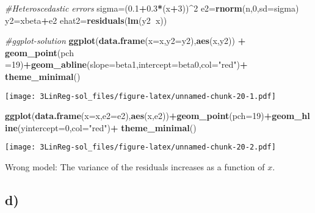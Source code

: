 \documentclass[]{article}
\newenvironment{Shaded}{\begin{snugshade}}{\end{snugshade}}
\newcommand{\KeywordTok}[1]{\textcolor[rgb]{0.13,0.29,0.53}{\textbf{#1}}}
\newcommand{\DataTypeTok}[1]{\textcolor[rgb]{0.13,0.29,0.53}{#1}}
\newcommand{\DecValTok}[1]{\textcolor[rgb]{0.00,0.00,0.81}{#1}}
\newcommand{\FloatTok}[1]{\textcolor[rgb]{0.00,0.00,0.81}{#1}}
\newcommand{\StringTok}[1]{\textcolor[rgb]{0.31,0.60,0.02}{#1}}
\newcommand{\CommentTok}[1]{\textcolor[rgb]{0.56,0.35,0.01}{\textit{#1}}}
\newcommand{\OperatorTok}[1]{\textcolor[rgb]{0.81,0.36,0.00}{\textbf{#1}}}
\newcommand{\NormalTok}[1]{#1}
\begin{document}
\begin{Shaded}
\begin{Highlighting}[]
\CommentTok{#Heteroscedastic errors}
\NormalTok{sigma=(}\FloatTok{0.1}\OperatorTok{+}\FloatTok{0.3}\OperatorTok{*}\NormalTok{(x}\OperatorTok{+}\DecValTok{3}\NormalTok{))}\OperatorTok{^}\DecValTok{2}
\NormalTok{e2=}\KeywordTok{rnorm}\NormalTok{(n,}\DecValTok{0}\NormalTok{,}\DataTypeTok{sd=}\NormalTok{sigma)}
\NormalTok{y2=xbeta}\OperatorTok{+}\NormalTok{e2}
\NormalTok{ehat2=}\KeywordTok{residuals}\NormalTok{(}\KeywordTok{lm}\NormalTok{(y2}\OperatorTok{~}\NormalTok{x))}

\CommentTok{#ggplot-solution}
\KeywordTok{ggplot}\NormalTok{(}\KeywordTok{data.frame}\NormalTok{(}\DataTypeTok{x=}\NormalTok{x,}\DataTypeTok{y2=}\NormalTok{y2),}\KeywordTok{aes}\NormalTok{(x,y2)) }\OperatorTok{+}
\StringTok{  }\KeywordTok{geom_point}\NormalTok{(}\DataTypeTok{pch =}\DecValTok{19}\NormalTok{)}\OperatorTok{+}\KeywordTok{geom_abline}\NormalTok{(}\DataTypeTok{slope=}\NormalTok{beta1,}\DataTypeTok{intercept=}\NormalTok{beta0,}\DataTypeTok{col=}\StringTok{"red"}\NormalTok{)}\OperatorTok{+}\StringTok{  }\KeywordTok{theme_minimal}\NormalTok{()}
\end{Highlighting}
\end{Shaded}

\texttt{[image: 3LinReg-sol\_files/figure-latex/unnamed-chunk-20-1.pdf]}

\begin{Shaded}
\begin{Highlighting}[]
\KeywordTok{ggplot}\NormalTok{(}\KeywordTok{data.frame}\NormalTok{(}\DataTypeTok{x=}\NormalTok{x,}\DataTypeTok{e2=}\NormalTok{e2),}\KeywordTok{aes}\NormalTok{(x,e2))}\OperatorTok{+}\KeywordTok{geom_point}\NormalTok{(}\DataTypeTok{pch=}\DecValTok{19}\NormalTok{)}\OperatorTok{+}\KeywordTok{geom_hline}\NormalTok{(}\DataTypeTok{yintercept=}\DecValTok{0}\NormalTok{,}\DataTypeTok{col=}\StringTok{"red"}\NormalTok{)}\OperatorTok{+}\StringTok{  }\KeywordTok{theme_minimal}\NormalTok{()}
\end{Highlighting}
\end{Shaded}

\texttt{[image: 3LinReg-sol\_files/figure-latex/unnamed-chunk-20-2.pdf]}

Wrong model: The variance of the residuals increases as a function of
\(x\).

\subsection{d)}\label{d-2}
\end{document}
